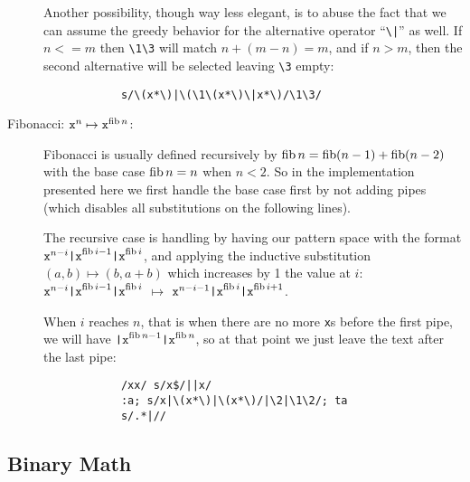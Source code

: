\begin{description}
		Another possibility, though way less elegant, is to abuse the fact
		that we can assume the greedy behavior for the alternative operator
		``\verb!\|!'' as well.  If $n<=m$ then \verb|\1\3| will match $n +
		(m-n)=m$, and if $n>m$, then the second alternative will be selected
		leaving \verb|\3| empty:
		\begin{Verbatim}
			s/\(x*\)|\(\1\(x*\)\|x*\)/\1\3/
		\end{Verbatim}

	\item[Fibonacci: $\texttt{x}^n\mapsto \texttt{x}^{\mathop{\mathrm{fib}} n}$:]

		Fibonacci is usually defined recursively by $\mathop{\mathrm{fib}} n = \mathop{\mathrm{fib}} (n-1) +
		\mathop{\mathrm{fib}} (n-2)$ with the base case $\mathop{\mathrm{fib}} n = n$ when $n<2$.  So in the
		implementation presented here we first handle the base case first by
		not adding pipes (which disables all substitutions on the following
		lines).

		The recursive case is handling by having our pattern space with the
		format $\texttt{x}^{n-i}\texttt{|x}^{\mathop{\mathrm{fib}} i-1}\texttt{|x}^{\mathop{\mathrm{fib}} i}$,
		and applying the inductive substitution $(a,b)\mapsto (b,a+b)$
		which increases by 1 the value at $i$:
		$\texttt{x}^{n-i}\texttt{|x}^{\mathop{\mathrm{fib}} i-1}\texttt{|x}^{\mathop{\mathrm{fib}} i}$
		$\mapsto$
		$\texttt{x}^{n-i-1}\texttt{|x}^{\mathop{\mathrm{fib}} i}\texttt{|x}^{\mathop{\mathrm{fib}} i+1}$.

		When $i$ reaches $n$, that is when there are no more {\tt x}s before
		the first pipe, we will have $\texttt{|x}^{\mathop{\mathrm{fib}} n-1}\texttt{|x}^{\mathop{\mathrm{fib}} n}$,
		so at that point we just leave the text after the last pipe:

		\begin{Verbatim}
			/xx/ s/x$/||x/
			:a; s/x|\(x*\)|\(x*\)/|\2|\1\2/; ta
			s/.*|//
		\end{Verbatim}

\end{description}

\subsection{Binary Math}

